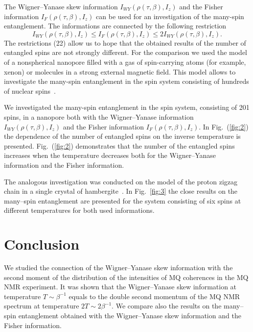 \documentclass[preprint,12pt]{elsarticle}
\begin{document}
The Wigner--Yanase skew information $I_{WY}(\rho(\tau,\beta),I_z)$ and the Fisher information $I_F(\rho(\tau,\beta),I_z)$ can be used for an investigation of the many-spin entanglement.
The informations are connected by the following restriction~\cite{3}
%
\begin{equation} \label{eq:22}
    I_{WY}\left(\rho(\tau,\beta), I_z\right)
    \leq I_F\left(\rho(\tau,\beta), I_z\right)
    \leq 2I_{WY}\left(\rho(\tau,\beta), I_z\right).
\end{equation}
%
The restrictions (22) allow us to hope that the obtained results of the number of entangled spins are not strongly different.
For the comparison we used the model~\cite{22} of a nonspherical nanopore filled with a gas of spin-carrying atoms (for example, xenon) or molecules in a strong external magnetic field.
This model allows to investigate the many-spin entanglement in the spin system consisting of hundreds of nuclear spins~\cite{7}.


We investigated the many-spin entanglement in the spin system, consisting of 201 spins, in a nanopore both with
the Wigner--Yanase information $I_{WY}\left(\rho(\tau, \beta), I_z\right)$
and the Fisher information $I_F\left(\rho(\tau,\beta),I_z\right)$.
In Fig.~(\ref{fig:2}) the dependence of the number of entangled spins on the inverse temperature is presented.
Fig.~(\ref{fig:2}) demonstrates that the number of the entangled spins increases when the temperature decreases both for the Wigner--Yanase information and the Fisher information.


The analogous investigation was conducted on the model of the proton zigzag chain in a single crystal of hambergite~\cite{15,23}.
In Fig.~\ref{fig:3} the close results on the many--spin entanglement are presented for the system consisting of six spins at different temperatures for both used informations.


\section{Conclusion}
\label{sec:5}

We studied the connection of the Wigner--Yanase skew information with the second moment of the distribution of the intensities of MQ coherences in the MQ NMR experiment.
It was shown that the Wigner--Yanase skew information at temperature $T \sim \beta^{-1}$ equals to the double second momentum of the MQ NMR spectrum at temperature $2T \sim 2\beta^{-1}$.
We compare also the results on the many--spin entanglement obtained with the Wigner--Yanase skew information and the Fisher information.
\end{document}
